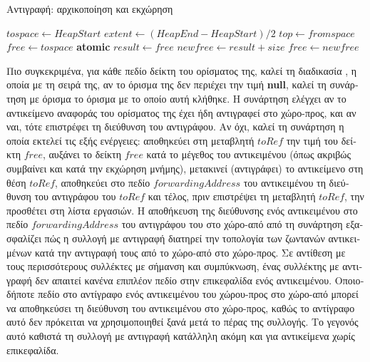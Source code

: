 \begin{greek}
\begin{algorithm}[H]
  \caption{Αντιγραφή: αρχικοποίηση και εκχώρηση}
  \label{alg:cop_1}
  \begin{algorithmic}[1]
      \State $tospace \gets HeapStart$
      \State $extent \gets (HeapEnd-HeapStart)/2$ 
      \State $top \gets fromspace$
      \State $free \gets tospace$
    \EndProcedure
    \Statex
      \State \textbf{atomic}
      \State $result \gets free$
      \State $newfree \gets result + size$
        \State {} 
      \EndIf
      \State $free \gets newfree$
      \State {}
    \EndFunction
  \end{algorithmic}
\end{algorithm}

Πιο συγκεκριμένα, 
για κάθε πεδίο δείκτη του ορίσματος της, καλεί τη διαδικασία 
, η οποία με τη σειρά της, αν το όρισμα της 
δεν περιέχει την τιμή \textbf{null}, καλεί τη συνάρτηση  
με όρισμα το όρισμα με το οποίο αυτή κλήθηκε. Η συνάρτηση  
ελέγχει αν το αντικείμενο αναφοράς του ορίσματος της έχει ήδη 
αντιγραφεί στο χώρο-προς, και αν ναι, τότε επιστρέφει τη διεύθυνση 
του αντιγράφου. Αν όχι, καλεί τη συνάρτηση  η 
οποία εκτελεί τις εξής ενέργειες: αποθηκεύει στη μεταβλητή $toRef$ 
την τιμή του δείκτη $free$, αυξάνει το δείκτη $free$ κατά το 
μέγεθος του αντικειμένου (όπως ακριβώς συμβαίνει και κατά την 
εκχώρηση μνήμης), μετακινεί (αντιγράφει) το αντικείμενο στη θέση 
$toRef$, αποθηκεύει στο πεδίο $forwardingAddress$ του αντικειμένου 
τη διεύθυνση του αντιγράφου του $toRef$ και τέλος, πριν επιστρέψει
τη μεταβλητή $toRef$, την προσθέτει στη λίστα εργασιών. Η αποθήκευση 
της διεύθυνσης ενός αντικειμένου στο πεδίο $forwardingAddress$ 
του αντιγράφου του στο χώρο-από από τη συνάρτηση  
εξασφαλίζει πώς η συλλογή με αντιγραφή διατηρεί την τοπολογία των 
ζωντανών αντικειμένων κατά την αντιγραφή τους από το χώρο-από στο
χώρο-προς. Σε αντίθεση με τους περισσότερους συλλέκτες με σήμανση 
και συμπύκνωση, ένας συλλέκτης με αντιγραφή δεν απαιτεί κανένα 
επιπλέον πεδίο στην επικεφαλίδα ενός αντικειμένου. Οποιοδήποτε 
πεδίο στο αντίγραφο ενός αντικειμένου του χώρου-προς στο χώρο-από 
μπορεί να αποθηκεύσει τη διεύθυνση του αντικειμένου στο χώρο-προς, 
καθώς το αντίγραφο αυτό δεν πρόκειται να χρησιμοποιηθεί ξανά 
μετά το πέρας της συλλογής. Το γεγονός αυτό καθιστά τη συλλογή 
με αντιγραφή κατάλληλη ακόμη και για αντικείμενα χωρίς επικεφαλίδα.


\end{greek}

